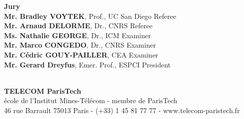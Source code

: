 \documentclass[12pt,a4paper]{book}
\begin{document}
%
%
%
\vfill
%
%
%
\flushleft
\begin{minipage}{.9\textwidth}	%
{\bf Jury}\\
{\bf Mr. Bradley VOYTEK}, {\small Prof., UC San Diego}
	\hfill Referee\\
{\bf Mr. Arnaud DELORME}, {\small Dr., CNRS}
	\hfill Referee\\
{\bf Ms. Nathalie GEORGE}, {\small Dr., ICM} \hfill Examiner\\
{\bf Mr. Marco CONGEDO}, {\small Dr., CNRS}
	\hfill Examiner\\
{\bf Mr. C\'{e}dric GOUY-PAILLER}, {\small CEA}
	\hfill Examiner\\
{\bf Mr. Gerard Dreyfus}, {\small Emer. Prof., ESPCI}
	\hfill President\\

\end{minipage}\\
%
%
%
\vspace{-.3cm}
%
%
%
{\centering
{\bf TELECOM ParisTech}\\
{\small \'{e}cole de l'Institut Mines-T\'{e}l\'{e}com - membre de ParisTech}\\
{\tiny 46 rue Barrault 75013 Paris - (+33) 1 45 81 77 77 - www.telecom-paristech.fr}}
%
%
%
%
\end{document}
